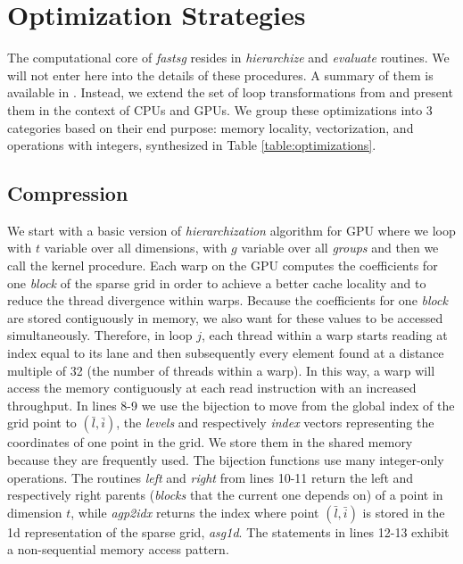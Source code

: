 \section{Optimization Strategies}
\label{sec:op_strategies}

The computational core of \textit{fastsg} resides in \textit{hierarchize} and
\textit{evaluate} routines. We will not enter here into the details of these
procedures. A summary of them is available in
\cite{Murarasu:2011:CDS:1941553.1941559}.
Instead, we extend the set of loop transformations from \cite{murarasu12fastsg:} and
present them in the context of CPUs and GPUs. We group these optimizations into
3 categories based on their end purpose: memory locality, vectorization, and
operations with integers, synthesized in Table \ref{table:optimizations}.

\subsection{Compression}

We start with a basic version of \textit{hierarchization} algorithm for GPU
where we loop with $t$ variable over all dimensions, with $g$ variable over all
\textit{groups} and then we call the kernel procedure. Each warp on the GPU
computes the coefficients for one \textit{block} of the sparse grid in order to
achieve a better cache locality and to reduce the thread divergence within
warps. Because the coefficients for one \textit{block} are stored contiguously
in memory, we also want for these values to be accessed simultaneously.
Therefore, in loop $j$, each thread within a warp starts reading at index equal
to its lane and then subsequently every element found at a distance multiple of 32 (the
number of threads within a warp). In this way, a warp will access the memory
contiguously at each read instruction with an increased throughput. In lines
8-9 we use the bijection to move from the global index of the grid point to
$(\bar{l}, \bar{i})$, the \textit{levels} and respectively \textit{index}
vectors representing the coordinates of one point in the grid. We store them in the
shared memory because they are frequently used. The bijection functions use many
integer-only operations. The routines \textit{left} and \textit{right}
from lines 10-11 return the left and respectively right parents (\textit{blocks}
that the current one depends on) of a point in dimension $t$, while
\textit{agp2idx} returns the index where point $(\bar{l}, \bar{i})$ is stored in
the 1d representation of the sparse grid, \textit{asg1d}. The statements in
lines 12-13 exhibit a non-sequential memory access pattern.

